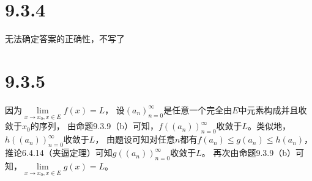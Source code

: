 \documentclass{article}
\begin{document}
\section*{9.3.4}



无法确定答案的正确性，不写了

\section*{9.3.5}

因为$\lim\limits_{x \rightarrow x_0, x \in E}f(x) = L$，
设$(a_n)_{n=0}^\infty$是任意一个完全由$E$中元素构成并且收敛于$x_0$的序列，
由命题9.3.9（b）可知，$f((a_n))_{n=0}^\infty$收敛于$L$。类似地，$h((a_n))_{n=0}^\infty$收敛于$L$，
由题设可知对任意$n$都有$f(a_n) \leq g(a_n) \leq h(a_n)$，
推论6.4.14（夹逼定理）可知$g((a_n))_{n=0}^\infty$收敛于$L$。
再次由命题9.3.9（b）可知，$\lim\limits_{x \rightarrow x_0, x \in E}g(x) = L$。
\end{document}
